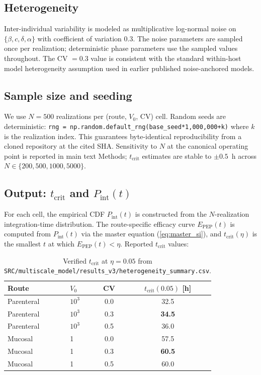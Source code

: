 \documentclass[11pt]{article}
\theoremstyle{definition}
\theoremstyle{remark}
\newcommand{\Pint}{P_{\text{int}}}
\newcommand{\Epep}{E_{\text{PEP}}}
\newcommand{\tcrit}{t_{\text{crit}}}
\begin{document}
\subsection{Heterogeneity}

Inter-individual variability is modeled as multiplicative log-normal noise on $\{\beta, c, \delta, \alpha\}$ with coefficient of variation $0.3$. The noise parameters are sampled once per realization; deterministic phase parameters use the sampled values throughout. The CV $= 0.3$ value is consistent with the standard within-host model heterogeneity assumption used in earlier published noise-anchored models.

\subsection{Sample size and seeding}

We use $N = 500$ realizations per (route, $V_{0}$, CV) cell. Random seeds are deterministic: \texttt{rng = np.random.default\_rng(base\_seed*1{,}000{,}000+k)} where $k$ is the realization index. This guarantees byte-identical reproducibility from a cloned repository at the cited SHA. Sensitivity to $N$ at the canonical operating point is reported in main text Methods; $\tcrit$ estimates are stable to $\pm 0.5$~h across $N \in \{200, 500, 1000, 5000\}$.

\subsection{Output: $\tcrit$ and $\Pint(t)$}

For each cell, the empirical CDF $\Pint(t)$ is constructed from the $N$-realization integration-time distribution. The route-specific efficacy curve $\Epep(t)$ is computed from $\Pint(t)$ via the master equation (\ref{eq:master_si}), and $\tcrit(\eta)$ is the smallest $t$ at which $\Epep(t) < \eta$. Reported $\tcrit$ values:

\begin{table}[H]
\centering
\small
\caption{Verified $\tcrit$ at $\eta = 0.05$ from \texttt{SRC/multiscale\_model/results\_v3/heterogeneity\_summary.csv}.}
\begin{tabular}{@{}llcc@{}}
\toprule
\textbf{Route} & \textbf{$V_{0}$} & \textbf{CV} & \textbf{$\tcrit(0.05)$ [h]} \\
\midrule
Parenteral  & $10^{3}$ & 0.0 & 32.5 \\
Parenteral  & $10^{3}$ & 0.3 & \textbf{34.5} \\
Parenteral  & $10^{3}$ & 0.5 & 36.0 \\
Mucosal     & 1        & 0.0 & 57.5 \\
Mucosal     & 1        & 0.3 & \textbf{60.5} \\
Mucosal     & 1        & 0.5 & 60.0 \\
\bottomrule
\end{tabular}
\end{table}
\end{document}
